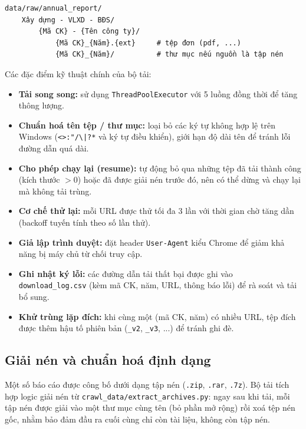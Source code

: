 \documentclass{article}
\begin{document}
\begin{verbatim}
data/raw/annual_report/
    Xây dựng - VLXD - BĐS/
        {Mã CK} - {Tên công ty}/
            {Mã CK}_{Năm}.{ext}     # tệp đơn (pdf, ...)
            {Mã CK}_{Năm}/          # thư mục nếu nguồn là tập nén
\end{verbatim}

Các đặc điểm kỹ thuật chính của bộ tải:

\begin{itemize}
  \item \textbf{Tải song song:} sử dụng \texttt{ThreadPoolExecutor} với 5 luồng
        đồng thời để tăng thông lượng.
  \item \textbf{Chuẩn hoá tên tệp / thư mục:} loại bỏ các ký tự không hợp lệ trên
        Windows (\texttt{<>:"/\textbackslash|?*} và ký tự điều khiển), giới hạn độ
        dài tên để tránh lỗi đường dẫn quá dài.
  \item \textbf{Cho phép chạy lại (resume):} tự động bỏ qua những tệp đã tải thành
        công (kích thước $>0$) hoặc đã được giải nén trước đó, nên có thể dừng và
        chạy lại mà không tải trùng.
  \item \textbf{Cơ chế thử lại:} mỗi URL được thử tối đa 3 lần với thời gian chờ
        tăng dần (backoff tuyến tính theo số lần thử).
  \item \textbf{Giả lập trình duyệt:} đặt header \texttt{User-Agent} kiểu Chrome để
        giảm khả năng bị máy chủ từ chối truy cập.
  \item \textbf{Ghi nhật ký lỗi:} các đường dẫn tải thất bại được ghi vào
        \texttt{download\_log.csv} (kèm mã CK, năm, URL, thông báo lỗi) để rà soát
        và tải bổ sung.
  \item \textbf{Khử trùng lặp đích:} khi cùng một (mã CK, năm) có nhiều URL, tệp
        đích được thêm hậu tố phiên bản (\texttt{\_v2}, \texttt{\_v3}, ...) để
        tránh ghi đè.
\end{itemize}

\subsection{Giải nén và chuẩn hoá định dạng}

Một số báo cáo được công bố dưới dạng tập nén (\texttt{.zip}, \texttt{.rar},
\texttt{.7z}). Bộ tải tích hợp logic giải nén từ
\texttt{crawl\_data/extract\_archives.py}: ngay sau khi tải, mỗi tập nén được
giải vào một thư mục cùng tên (bỏ phần mở rộng) rồi xoá tệp nén gốc, nhằm bảo đảm
đầu ra cuối cùng chỉ còn tài liệu, không còn tập nén.
\end{document}
